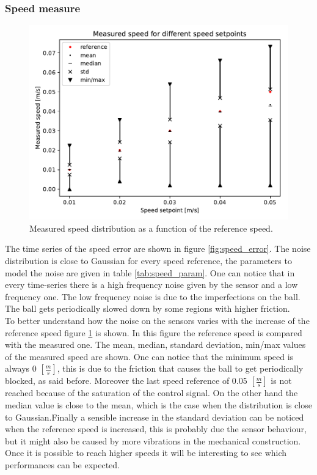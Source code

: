 \documentclass[12pt,a4paper, twoside]{article}
\begin{document}
\subsubsection{Speed measure}
\begin{figure}
	\centering
	\includegraphics[width=\linewidth]{fig/steady_state}
	\caption{Measured speed distribution as a function of the reference speed.}\label{fig:steady_state}
\end{figure}
The time series of the speed error are shown in figure \ref{fig:speed_error}.
The noise distribution is close to Gaussian for every speed reference, the parameters to model the noise are given in table \ref{tab:speed_param}. One can notice that in every time-series there is a high frequency noise given by the sensor and a low frequency one. The low frequency noise is due to the imperfections on the ball. The ball gets periodically slowed down by some regions with higher friction.\\
To better understand how the noise on the sensors varies with the increase of the reference speed figure \ref{fig:steady_state} is shown.
In this figure the reference speed is compared with the measured one. The mean, median, standard deviation, min/max values of the measured speed are shown. One can notice that the minimum speed is always 0 $[\frac{m}{s}]$, this is due to the friction that causes the ball to get periodically blocked, as said before. Moreover the last speed reference of 0.05 $[\frac{m}{s}]$ is not reached because of the saturation of the control signal. On the other hand the median value is close to the mean, which is the case when the distribution is close to Gaussian.Finally a sensible increase in the standard deviation can be noticed when the reference speed is increased, this is probably due the sensor behaviour, but it might also be caused by more vibrations in the mechanical construction. Once it is possible to reach higher speeds it will be interesting to see which performances can be expected.
\end{document}
